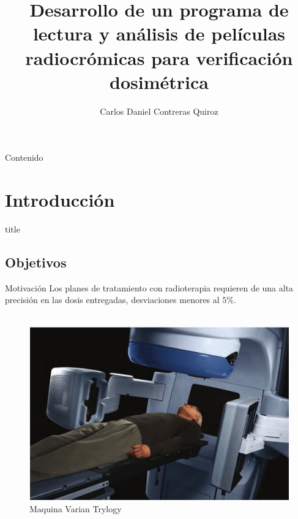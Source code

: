 \documentclass[12pt]{beamer}
\begin{document}
	\author{Carlos Daniel Contreras Quiroz}
	\title{Desarrollo de un programa de lectura y análisis de películas radiocrómicas para verificación dosimétrica}
	\begin{frame}[plain]
	\maketitle
\end{frame}

\begin{frame}{Contenido}
\tableofcontents
\end{frame}

\section{Introducción}
\begin{frame}
\vfill
\centering
\begin{beamercolorbox}[sep=8pt,center,shadow=true,rounded=true]{title}
	\insertsectionhead\par%
\end{beamercolorbox}
\vfill
\end{frame}
\subsection{Objetivos}

\begin{frame}{Motivación}
Los planes de tratamiento con radioterapia requieren de una alta precisión en las dosis entregadas, desviaciones menores al $5\%$.  \\~\\

\begin{figure}
	\centering
	\includegraphics[width=0.7\linewidth]{images/paciente.png}
	\caption{Maquina Varian Trylogy \cite{khan2014the}}
\end{figure}

\end{frame}
\end{document}
